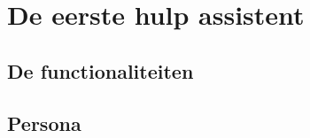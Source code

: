 
\chapter{De eerste hulp assistent}
\label{ch:De eerste hulp assistent}

\section{De functionaliteiten}
\label{De functionaliteiten}

\section{Persona}
\label{Persona}


